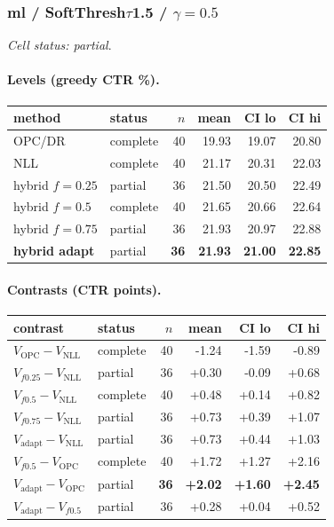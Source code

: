 \documentclass[10pt,a4paper]{article}
\begin{document}
\subsubsection{ml / SoftThresh$\tau$1.5 / $\gamma=0.5$}
\emph{Cell status: partial}.
\paragraph{Levels (greedy CTR \%).}
{\centering\small\begin{tabular}{llrrrr}
\toprule method & status & $n$ & mean & CI lo & CI hi \\
\midrule
OPC/DR & complete & 40 & 19.93 & 19.07 & 20.80 \\
NLL & complete & 40 & 21.17 & 20.31 & 22.03 \\
hybrid $f{=}0.25$ & partial & 36 & 21.50 & 20.50 & 22.49 \\
hybrid $f{=}0.5$ & complete & 40 & 21.65 & 20.66 & 22.64 \\
hybrid $f{=}0.75$ & partial & 36 & 21.93 & 20.97 & 22.88 \\
\textbf{hybrid adapt} & partial & \textbf{36} & \textbf{21.93} & \textbf{21.00} & \textbf{22.85} \\
\bottomrule\end{tabular}\par}
\paragraph{Contrasts (CTR points).}
{\centering\small\begin{tabular}{llrrrr}
\toprule contrast & status & $n$ & mean & CI lo & CI hi \\
\midrule
$V_{\mathrm{OPC}}-V_{\mathrm{NLL}}$ & complete & 40 & -1.24 & -1.59 & -0.89 \\
$V_{f0.25}-V_{\mathrm{NLL}}$ & partial & 36 & +0.30 & -0.09 & +0.68 \\
$V_{f0.5}-V_{\mathrm{NLL}}$ & complete & 40 & +0.48 & +0.14 & +0.82 \\
$V_{f0.75}-V_{\mathrm{NLL}}$ & partial & 36 & +0.73 & +0.39 & +1.07 \\
$V_{\mathrm{adapt}}-V_{\mathrm{NLL}}$ & partial & 36 & +0.73 & +0.44 & +1.03 \\
$V_{f0.5}-V_{\mathrm{OPC}}$ & complete & 40 & +1.72 & +1.27 & +2.16 \\
\textbf{$V_{\mathrm{adapt}}-V_{\mathrm{OPC}}$} & partial & \textbf{36} & \textbf{+2.02} & \textbf{+1.60} & \textbf{+2.45} \\
$V_{\mathrm{adapt}}-V_{f0.5}$ & partial & 36 & +0.28 & +0.04 & +0.52 \\
\bottomrule\end{tabular}\par}
\end{document}
